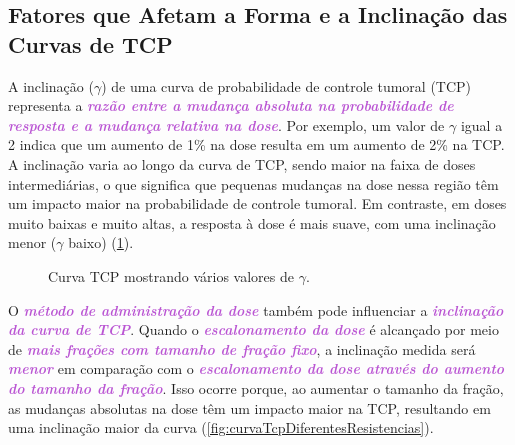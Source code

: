 \documentclass[11pt,a4paper]{article}
\newcounter{exemplo}
\begin{document}
\subsection*{Fatores que Afetam a Forma e a Inclinação das Curvas de TCP}

	A inclinação ($\gamma$) de uma curva de probabilidade de controle tumoral (TCP) representa a \textcolor{MediumOrchid}{\textbf{\textit{razão entre a mudança absoluta na probabilidade de resposta e a mudança relativa na dose}}}. Por exemplo, um valor de $\gamma$ igual a 2 indica que um aumento de 1\% na dose resulta em um aumento de 2\% na TCP. A inclinação varia ao longo da curva de TCP, sendo maior na faixa de doses intermediárias, o que significa que pequenas mudanças na dose nessa região têm um impacto maior na probabilidade de controle tumoral. Em contraste, em doses muito baixas e muito altas, a resposta à dose é mais suave, com uma inclinação menor ($\gamma$ baixo) (\ref{fig:CurvaTcp}).

	\begin{figure}[h]
		\centering
		\caption{Curva TCP mostrando vários valores de $\gamma$.}
		\label{fig:CurvaTcp}
	\end{figure}

	O \textcolor{MediumOrchid}{\textbf{\textit{método de administração da dose}}} também pode influenciar a \textcolor{MediumOrchid}{\textbf{\textit{inclinação da curva de TCP}}}. Quando o \textcolor{MediumOrchid}{\textbf{\textit{escalonamento da dose}}} é alcançado por meio de \textcolor{MediumOrchid}{\textbf{\textit{mais frações com tamanho de fração fixo}}}, a inclinação medida será \textcolor{MediumOrchid}{\textbf{\textit{menor}}} em comparação com o \textcolor{MediumOrchid}{\textbf{\textit{escalonamento da dose através do aumento do tamanho da fração}}}. Isso ocorre porque, ao aumentar o tamanho da fração, as mudanças absolutas na dose têm um impacto maior na TCP, resultando em uma inclinação maior da curva (\ref{fig:curvaTcpDiferentesResistencias}).
\end{document}
